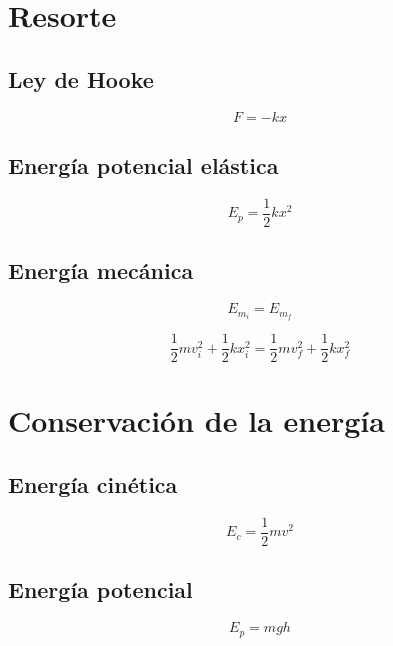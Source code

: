 \documentclass[a4paper,12pt]{article}
\begin{document}
\section{Resorte}

\subsection{Ley de Hooke}

\begin{equation*}
    F = - k x
\end{equation*}

\subsection{Energía potencial elástica}

\begin{equation*}
    E_p = \frac{1}{2} k x^2
\end{equation*}

\subsection{Energía mecánica}

\begin{equation*}
    E_{m_i} = E_{m_f}
\end{equation*}

\begin{equation*}
    \frac{1}{2} m v_i^2 + \frac{1}{2} k x_i^2 = \frac{1}{2} m v_f^2 + \frac{1}{2} k x_f^2
\end{equation*}


\section{Conservación de la energía}

\subsection{Energía cinética}

\begin{equation*}
    E_c = \frac{1}{2} m v^2
\end{equation*}

\subsection{Energía potencial}

\begin{equation*}
    E_p = m g h
\end{equation*}
\end{document}
